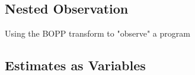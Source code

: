\subsection{Nested Observation}
\label{sec:design:imp:obs}

Using the BOPP transform to "observe" a program

\subsection{Estimates as Variables}
\label{sec:design:imp:expt}





